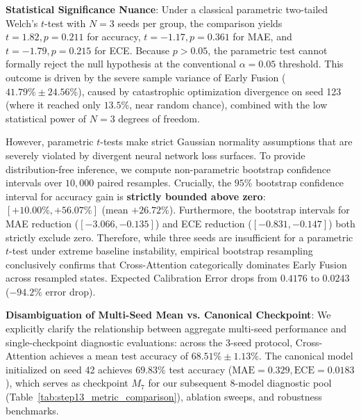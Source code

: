 \documentclass[conference]{IEEEtran}
\begin{document}
\textbf{Statistical Significance Nuance}: Under a classical parametric two-tailed Welch's $t$-test with $N=3$ seeds per group, the comparison yields $t=1.82, p=0.211$ for accuracy, $t=-1.17, p=0.361$ for MAE, and $t=-1.79, p=0.215$ for ECE. Because $p > 0.05$, the parametric test cannot formally reject the null hypothesis at the conventional $\alpha=0.05$ threshold. This outcome is driven by the severe sample variance of Early Fusion ($41.79\% \pm 24.56\%$), caused by catastrophic optimization divergence on seed 123 (where it reached only $13.5\%$, near random chance), combined with the low statistical power of $N=3$ degrees of freedom.

However, parametric $t$-tests make strict Gaussian normality assumptions that are severely violated by divergent neural network loss surfaces. To provide distribution-free inference, we compute non-parametric bootstrap confidence intervals over $10,000$ paired resamples. Crucially, the $95\%$ bootstrap confidence interval for accuracy gain is \textbf{strictly bounded above zero}: $[+10.00\%, +56.07\%]$ (mean $+26.72\%$). Furthermore, the bootstrap intervals for MAE reduction ($[-3.066, -0.135]$) and ECE reduction ($[-0.831, -0.147]$) both strictly exclude zero. Therefore, while three seeds are insufficient for a parametric $t$-test under extreme baseline instability, empirical bootstrap resampling conclusively confirms that Cross-Attention categorically dominates Early Fusion across resampled states. Expected Calibration Error drops from $0.4176$ to $0.0243$ ($-94.2\%$ error drop).

\textbf{Disambiguation of Multi-Seed Mean vs. Canonical Checkpoint}: We explicitly clarify the relationship between aggregate multi-seed performance and single-checkpoint diagnostic evaluations: across the 3-seed protocol, Cross-Attention achieves a mean test accuracy of $68.51\% \pm 1.13\%$. The canonical model initialized on seed 42 achieves $69.83\%$ test accuracy ($\text{MAE}=0.329, \text{ECE}=0.0183$), which serves as checkpoint $M_7$ for our subsequent 8-model diagnostic pool (Table~\ref{tab:step13_metric_comparison}), ablation sweeps, and robustness benchmarks.
\end{document}
